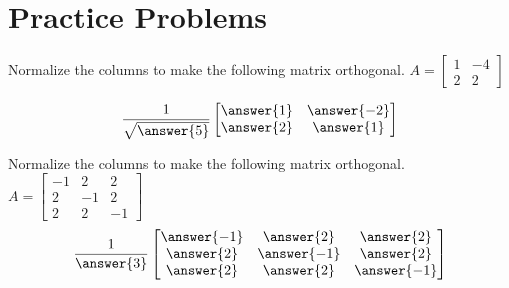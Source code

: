 \documentclass{ximera}
\begin{document}
\section*{Practice Problems}

\begin{problem}\label{prob:make_ortho_matrix3}
Normalize the columns to make the following matrix orthogonal.
$A = \begin{bmatrix}
1 & -4 \\
2 & 2
\end{bmatrix}$

$$\frac{1}{\sqrt{\answer{5}}}\begin{bmatrix}\answer{1} & \answer{-2}\\\answer{2} & \answer{1}\end{bmatrix}$$
\end{problem}

\begin{problem}\label{prob:make_ortho_matrix7}
Normalize the columns to make the following matrix orthogonal.
$A = \begin{bmatrix}
-1 & 2 & 2 \\
2 & -1 & 2 \\
2 & 2 & -1
\end{bmatrix}$
$$\frac{1}{\answer{3}}\begin{bmatrix}\answer{-1} & \answer{2} & \answer{2} \\
\answer{2} & \answer{-1} & \answer{2} \\
\answer{2} & \answer{2} & \answer{-1}
\end{bmatrix}$$
\end{problem}
\end{document}
